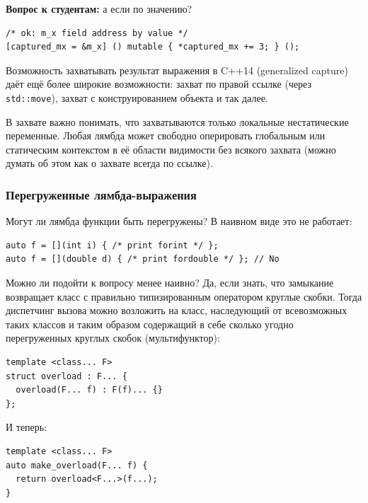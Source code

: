 \documentclass[a4paper,12pt,oneside]{article}
\newif\ifanswers
\begin{document}
\ifanswers
Правильный ответ следует из простого размышления: что вообще синтаксически должна означать запись в такой адрес? Перемещение поля класса, хм?
\fi

\textbf{Вопрос к студентам:} а если по значению?

\begin{lstlisting}
/* ok: m_x field address by value */
[captured_mx = &m_x] () mutable { *captured_mx += 3; } ();
\end{lstlisting}

\ifanswers
Правильный ответ: да, по значению все хорошо
\fi

Возможность захватывать результат выражения в C++14 (generalized capture) даёт ещё более широкие возможности: захват по правой ссылке (через \lstinline!std::move!), захват с конструированием объекта и так далее.

В захвате важно понимать, что захватываются только локальные нестатические переменные. Любая лямбда может свободно оперировать глобальным или статическим контекстом в её области видимости без всякого захвата (можно думать об этом как о захвате всегда по ссылке).

\subsubsection{Перегруженные лямбда-выражения}\label{OverLambdas}

Могут ли лямбда функции быть перегружены? В наивном виде это не работает:

\begin{lstlisting}
auto f = [](int i) { /* print forint */ };
auto f = [](double d) { /* print fordouble */ }; // No
\end{lstlisting}

Можно ли подойти к вопросу менее наивно? Да, если знать, что замыкание возвращает класс с правильно типизированным оператором круглые скобки. Тогда диспетчинг вызова можно возложить на класс, наследующий от всевозможных таких классов и таким образом содержащий в себе сколько угодно перегруженных круглых скобок (мультифунктор):

\begin{lstlisting}
template <class... F>
struct overload : F... {
  overload(F... f) : F(f)... {} 
};
\end{lstlisting}

И теперь:
 
\begin{lstlisting}
template <class... F>
auto make_overload(F... f) {
  return overload<F...>(f...);  
}
\end{lstlisting}
\end{document}
